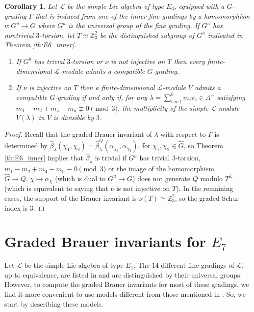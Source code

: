 \documentclass[a4paper,reqno]{amsart}
\newtheorem{corollary}[theorem]{Corollary}
\theoremstyle{definition}
\numberwithin{theorem}{section}
\numberwithin{equation}{section}
\begin{document}
\begin{corollary}
Let ${\mathcal{L}}$ be the simple Lie algebra of type $E_6$, equipped with a $G$-grading $\Gamma$ that is induced from one of the inner fine gradings by a homomorphism $\nu\colon G^u\to G$ where $G^u$ is the universal group of the fine grading. If $G^u$ has nontrivial $3$-torsion, let $T\simeq{\mathbb{Z}}_3^2$ be the distinguished subgroup of $G^u$ indicated in Theorem \ref{th:E6_inner}.
\begin{enumerate}
\item[(a)] If $G^u$ has trivial $3$-torsion or $\nu$ is not injective on $T$ then every finite-dimensional ${\mathcal{L}}$-module admits a compatible $G$-grading. 
\item[(b)] If $\nu$ is injective on $T$ then a finite-dimensional ${\mathcal{L}}$-module $V$ admits a compatible $G$-grading if and only if, for any $\lambda=\sum_{i=1}^6 m_i{\pi}_i\in\Lambda^+$ satisfying $m_1-m_2+m_4-m_5\not\equiv 0\pmod{3}$, the multiplicity of the simple ${\mathcal{L}}$-module $V(\lambda)$ in $V$ is divisible by $3$.
\end{enumerate}
\end{corollary}

\begin{proof}
Recall that the graded Brauer invariant of $\lambda$ with respect to $\Gamma$ is determined by $\hat{\beta}_\lambda(\chi_1,\chi_2)=\hat{\beta}^Q_\lambda(\alpha_{\chi_1},\alpha_{\chi_2})$, for $\chi_1,\chi_2\in{\widehat{{G}}}$, so Theorem \ref{th:E6_inner} implies that $\hat{\beta}_\lambda$ is trivial if $G^u$ has trivial $3$-torsion, $m_1-m_2+m_4-m_5\equiv 0\pmod{3}$ or the image of the homomorphism ${\widehat{{G}}}\to Q,\,\chi\mapsto\alpha_\chi$ (which is dual to $G^u\to G$) does not generate $Q$ modulo $T^\perp$ (which is equivalent to saying that $\nu$ is not injective on $T$). In the remaining cases, the support of the Brauer invariant is $\nu(T)\simeq{\mathbb{Z}}_3^2$, so the graded Schur index is $3$.
\end{proof}

\section{Graded Brauer invariants for $E_7$}\label{se:E7}

Let ${\mathcal{L}}$ be the simple Lie algebra of type $E_7$. The $14$ different fine gradings of ${\mathcal{L}}$, up to equivalence, are listed in \cite[Fig. 6.2]{EK_mon} and are distinguished by their universal groups. However, to compute the graded Brauer invariants for most of these gradings, we find it more convenient to use models different from those mentioned in \cite{EK_mon}. So, we start by describing these models.
\end{document}
